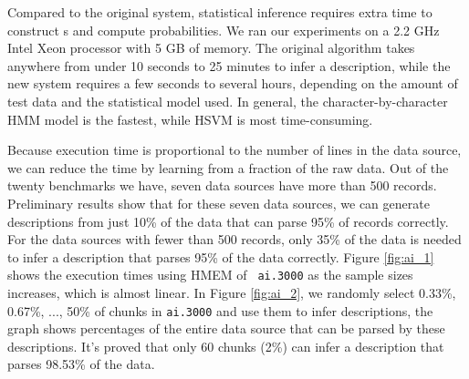 
Compared to the original system, 
statistical inference requires extra time to construct \seqset{}s and
compute probabilities. 
We ran our experiments on a 2.2 GHz Intel Xeon processor with 5
GB of memory. The original algorithm takes anywhere from 
under 10 seconds to 25 minutes to infer a description, while the new system
requires a few seconds to several hours, depending on the amount of test data
and the statistical model used. In general, the character-by-character
HMM model is the fastest, while HSVM is most time-consuming.

Because execution time is proportional to the
number of lines in the data source, we can reduce the time by
learning from a fraction of the raw data. 
Out of the twenty benchmarks we have, seven data sources
have more than 500 records.  Preliminary results show that for these
seven data sources, we can generate descriptions from just 10\% of the data that can
parse 95\% of records correctly.
For the data sources with fewer than 500 records,
only 35\% of the data is needed to infer a description that parses
95\% of the data correctly.
Figure \ref{fig:ai_1} shows the execution times using HMEM of {\tt
  ai.3000} as the sample sizes increases, which is almost linear. In Figure
\ref{fig:ai_2}, we randomly select 0.33\%, 0.67\%, ..., 50\% of chunks in {\tt ai.3000}
and use them to infer descriptions, the graph shows percentages of the
entire data source that can be parsed by these descriptions. It's
proved that only 60 chunks (2\%) can infer a description that parses 98.53\%
of the data.

